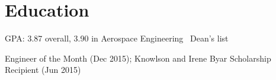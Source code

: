 \documentclass[letterpaper]{deedy-resume}
\begin{document}
\begin{minipage}[t]{\textwidth} %
\vspace{2ex}
    \section{Education}
    

    \vspace{1em}
    {}
    
    \begin{compactitem}
        \item GPA: 3.87 overall, 3.90 in Aerospace Engineering \textemdash\ Dean's list
        \item Engineer of the Month (Dec 2015); Knowlson and Irene Byar Scholarship Recipient (Jun 2015)
    \end{compactitem}

    \vspace*{2ex}

\end{minipage}
\end{document}
